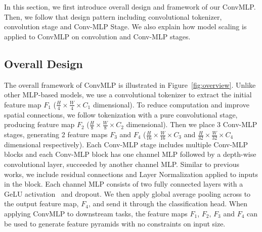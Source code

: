 \documentclass[final]{cvpr}
\begin{document}
\begin{table*}[!ht]
\centering
{}

\caption{Ablation study on ImageNet-1k validation set. All experiments are based on ConvMLP-S. $\dagger$ denotes slightly modified Conv Stage with improved accuracy in the long run which is used in our final ConvMLP-S model.}
\label{tab:ablation}
\end{table*} In this section, we first introduce overall design and framework of our ConvMLP. Then, we follow that design pattern including convolutional tokenizer, convolution stage and Conv-MLP Stage. We also explain how model scaling is applied to ConvMLP on convolution and Conv-MLP stages.

\subsection{Overall Design}
The overall framework of ConvMLP is illustrated in Figure~\ref{fig:overview}. Unlike other MLP-based models, we use a convolutional tokenizer to extract the initial feature map $F_1$ ($\frac{H}{4}\times \frac{W}{4} \times C_1$ dimensional). To reduce computation and improve spatial connections, we follow tokenization with a pure convolutional stage, producing feature map $F_2$ ($\frac{H}{8}\times \frac{W}{8} \times C_2$ dimensional). Then we place 3 Conv-MLP stages, generating 2 feature maps $F_3$ and $F_4$ ($\frac{H}{16}\times \frac{W}{16} \times C_3$ and $\frac{H}{32}\times \frac{W}{32} \times C_4$ dimensional respectively). Each Conv-MLP stage includes multiple Conv-MLP blocks and each Conv-MLP block has one channel MLP followed by a depth-wise convolutional layer, succeeded by another channel MLP. Similar to previous works, we include residual connections and Layer Normalization applied to inputs in the block. Each channel MLP consists of two fully connected layers with a GeLU activation~\cite{hendrycks2016gaussian} and dropout. We then apply global average pooling across to the output feature map, $F_4$, and send it through the classification head. When applying ConvMLP to downstream tasks, the feature maps $F_1$, $F_2$, $F_3$ and $F_4$ can be used to generate feature pyramids with no constraints on input size.
\end{document}
